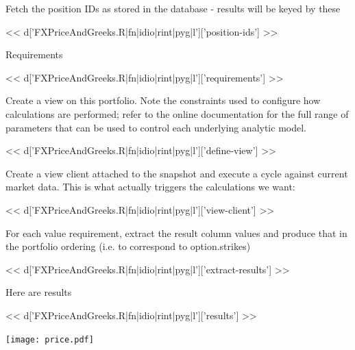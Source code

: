 \documentclass[custom, plainsections]{sciposter}
\begin{document}
\begin{multicols*}{2}
Fetch the position IDs as stored in the database - results will be keyed by these

<< d['FXPriceAndGreeks.R|fn|idio|rint|pyg|l']['position-ids'] >>

Requirements

<< d['FXPriceAndGreeks.R|fn|idio|rint|pyg|l']['requirements'] >>

Create a view on this portfolio. Note the constraints used to configure how
calculations are performed; refer to the online documentation for the full range
of parameters that can be used to control each underlying analytic model.

<< d['FXPriceAndGreeks.R|fn|idio|rint|pyg|l']['define-view'] >>

Create a view client attached to the snapshot and execute a cycle against current market data. This is what actually triggers the calculations we want:

<< d['FXPriceAndGreeks.R|fn|idio|rint|pyg|l']['view-client'] >>

For each value requirement, extract the result column values and produce that in the portfolio
ordering (i.e. to correspond to option.strikes)

<< d['FXPriceAndGreeks.R|fn|idio|rint|pyg|l']['extract-results'] >>

Here are results

<< d['FXPriceAndGreeks.R|fn|idio|rint|pyg|l']['results'] >>

\texttt{[image: price.pdf]}

\end{multicols*}

\pagebreak
\end{document}
